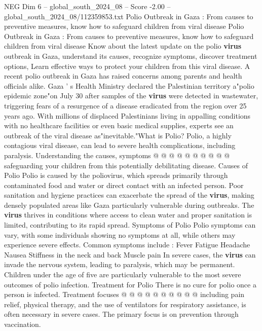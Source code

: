 \begin{textsample}{NEG Dim 6 – global\_south\_2024\_08 – Score -2.00 – global\_south\_2024\_08/112359853.txt}  \label{ex:f6_neg_056}
Polio Outbreak in Gaza : From causes to preventive measures, know how to safeguard children from viral disease Polio Outbreak in Gaza : From causes to preventive measures, know how to safeguard children from viral disease Know about the latest update on the polio \textbf{virus} outbreak in Gaza, understand its causes, recognize symptoms, discover treatment options, Learn effective ways to protect your children from this viral disease.
A recent polio outbreak in Gaza has raised concerns among parents and health officials alike.
Gaza ' s Health Ministry declared the Palestinian territory a"polio epidemic zone"on July 30 after samples of the \textbf{virus} were detected in wastewater, triggering fears of a resurgence of a disease eradicated from the region over 25 years ago.
With millions of displaced Palestinians living in appalling conditions with no healthcare facilities or even basic medical supplies, experts see an outbreak of the viral disease as"inevitable."What is Polio?
Polio, a highly contagious viral disease, can lead to severe health complications, including paralysis.
Understanding the causes, symptoms @ @ @ @ @ @ @ @ @ @ safeguarding your children from this potentially debilitating disease.
Causes of Polio Polio is caused by the poliovirus, which spreads primarily through contaminated food and water or direct contact with an infected person.
Poor sanitation and hygiene practices can exacerbate the spread of the \textbf{virus}, making densely populated areas like Gaza particularly vulnerable during outbreaks.
The \textbf{virus} thrives in conditions where access to clean water and proper sanitation is limited, contributing to its rapid spread.
Symptoms of Polio Polio symptoms can vary, with some individuals showing no symptoms at all, while others may experience severe effects.
Common symptoms include : Fever Fatigue Headache Nausea Stiffness in the neck and back Muscle pain In severe cases, the \textbf{virus} can invade the nervous system, leading to paralysis, which may be permanent.
Children under the age of five are particularly vulnerable to the most severe outcomes of polio infection.
Treatment for Polio There is no cure for polio once a person is infected.
Treatment focuses @ @ @ @ @ @ @ @ @ @ including pain relief, physical therapy, and the use of ventilators for respiratory assistance, is often necessary in severe cases.
The primary focus is on prevention through vaccination.

\end{textsample}
